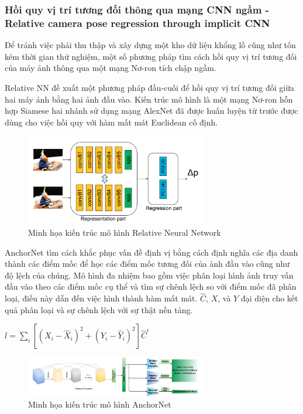 \subsubsection*{Hồi quy vị trí tương đối thông qua mạng CNN ngầm - Relative camera pose regression through implicit CNN}
Để tránh việc phải thu thập và xây dựng một kho dữ liệu khổng lồ cũng như tốn kém thời gian thử nghiệm, một số phương pháp tìm cách hồi quy vị trí tương đối của máy ảnh thông qua một mạng Nơ-ron tích chập ngầm.

Relative NN \cite{melekhov2017relative} đề xuất một phương pháp đầu-cuối để hồi quy vị trí tương đối giữa hai máy ảnh bằng hai ảnh đầu vào. Kiến trúc mô hình là một mạng Nơ-ron hỗn hợp Siamese hai nhánh sử dụng mạng AlexNet đã được huấn luyện từ trước được dùng cho việc hồi quy với hàm mất mát Euclidean cố định.
\begin{figure}[H]
    \centering
    \includegraphics[width=0.7\textwidth]{pics/Chapter2/relativenn.png}
    \caption{Minh họa kiến trúc mô hình Relative Neural Network \cite{melekhov2017relative}}
\end{figure}
AnchorNet \cite{saha2018improved} tìm cách khắc phục vấn đề định vị bằng cách định nghĩa các địa danh thành các điểm mốc để học các điểm mốc tương đối của ảnh đầu vào cũng như độ lệch của chúng. Mô hình đa nhiệm bao gồm việc phân loại hình ảnh truy vấn đầu vào theo các điểm mốc cụ thể và tìm sự chênh lệch so với điểm mốc đã phân loại, điều này dẫn đến việc hình thành hàm mất mát. $\hat{C}$, $X$, và $Y$ đại diện cho kết quả phân loại và sự chênh lệch với sự thật nền tảng.
\begin{center}
$l = \sum_i[(X_i - \hat{X}_i)^2 + (Y_i - \hat{Y}_i)^2]\hat{C}^i$
\end{center}
\begin{figure}[H]
    \centering
    \includegraphics[width=0.7\textwidth]{pics/Chapter2/anchornet.png}
    \caption{Minh họa kiến trúc mô hình AnchorNet \cite{saha2018improved}}
\end{figure}

